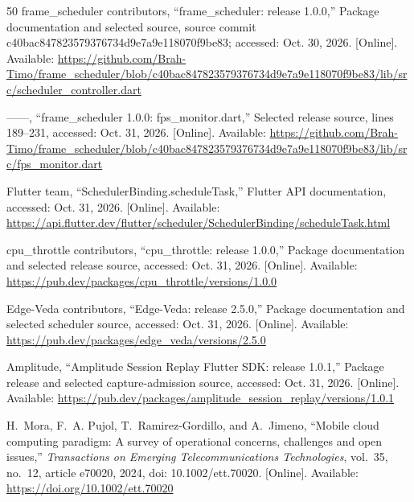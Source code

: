 \documentclass[14pt,a4paper,oneside]{extreport}
\begin{document}
\begin{thebibliography}{50}
\BIBentryALTinterwordspacing
{frame\_scheduler contributors}, ``{frame\_scheduler}: release 1.0.0,'' Package
  documentation and selected source, source commit
  c40bac847823579376734d9e7a9e118070f9be83; accessed: Oct. 30, 2026. [Online].
  Available:
  \url{https://github.com/Brah-Timo/frame_scheduler/blob/c40bac847823579376734d9e7a9e118070f9be83/lib/src/scheduler_controller.dart}
\BIBentrySTDinterwordspacing

\BIBentryALTinterwordspacing
------, ``{frame\_scheduler} 1.0.0: {fps\_monitor.dart},'' Selected release
  source, lines 189--231, accessed: Oct. 31, 2026. [Online]. Available:
  \url{https://github.com/Brah-Timo/frame_scheduler/blob/c40bac847823579376734d9e7a9e118070f9be83/lib/src/fps_monitor.dart}
\BIBentrySTDinterwordspacing

\BIBentryALTinterwordspacing
{Flutter team}, ``{SchedulerBinding.scheduleTask},'' Flutter API documentation,
  accessed: Oct. 31, 2026. [Online]. Available:
  \url{https://api.flutter.dev/flutter/scheduler/SchedulerBinding/scheduleTask.html}
\BIBentrySTDinterwordspacing

\BIBentryALTinterwordspacing
{cpu\_throttle contributors}, ``{cpu\_throttle}: release 1.0.0,'' Package
  documentation and selected release source, accessed: Oct. 31, 2026. [Online].
  Available: \url{https://pub.dev/packages/cpu_throttle/versions/1.0.0}
\BIBentrySTDinterwordspacing

\BIBentryALTinterwordspacing
{Edge-Veda contributors}, ``{Edge-Veda}: release 2.5.0,'' Package documentation
  and selected scheduler source, accessed: Oct. 31, 2026. [Online]. Available:
  \url{https://pub.dev/packages/edge_veda/versions/2.5.0}
\BIBentrySTDinterwordspacing

\BIBentryALTinterwordspacing
{Amplitude}, ``{Amplitude Session Replay Flutter SDK}: release 1.0.1,'' Package
  release and selected capture-admission source, accessed: Oct. 31, 2026.
  [Online]. Available:
  \url{https://pub.dev/packages/amplitude_session_replay/versions/1.0.1}
\BIBentrySTDinterwordspacing

H.~Mora, F.~A. Pujol, T.~Ramirez-Gordillo, and A.~Jimeno, ``Mobile cloud
computing paradigm: A survey of operational concerns, challenges and open
issues,'' \emph{Transactions on Emerging Telecommunications Technologies},
vol.~35, no.~12, article e70020, 2024, doi: 10.1002/ett.70020.
[Online]. Available: \url{https://doi.org/10.1002/ett.70020}


\end{thebibliography}
\end{document}
